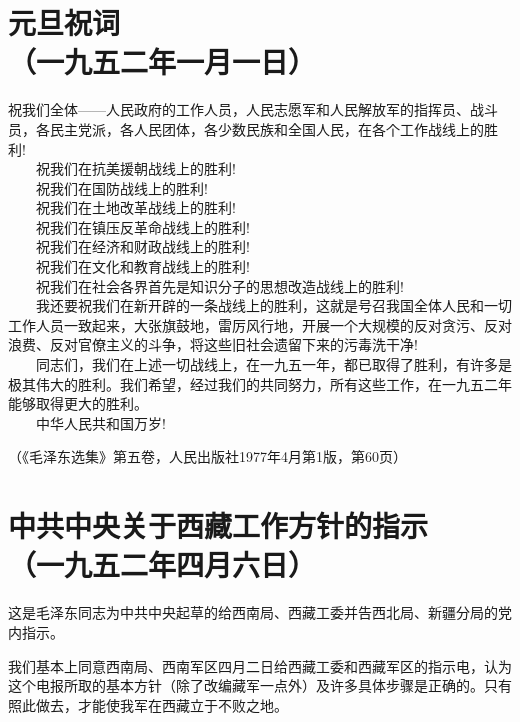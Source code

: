 \documentclass[cn,11pt,chinese]{elegantbook}
\def\myformat#1{\hfil\hfil #1}
\begin{document}
\newpage\section*{\myformat{元旦祝词}\\\myformat{（一九五二年一月一日）}}
祝我们全体——人民政府的工作人员，人民志愿军和人民解放军的指挥员、战斗员，各民主党派，各人民团体，各少数民族和全国人民，在各个工作战线上的胜利!\\
　　祝我们在抗美援朝战线上的胜利!\\
　　祝我们在国防战线上的胜利!\\
　　祝我们在土地改革战线上的胜利!\\
　　祝我们在镇压反革命战线上的胜利!\\
　　祝我们在经济和财政战线上的胜利!\\
　　祝我们在文化和教育战线上的胜利!\\
　　祝我们在社会各界首先是知识分子的思想改造战线上的胜利!\\
　　我还要祝我们在新开辟的一条战线上的胜利，这就是号召我国全体人民和一切工作人员一致起来，大张旗鼓地，雷厉风行地，开展一个大规模的反对贪污、反对浪费、反对官僚主义的斗争，将这些旧社会遗留下来的污毒洗干净!\\
　　同志们，我们在上述一切战线上，在一九五一年，都已取得了胜利，有许多是极其伟大的胜利。我们希望，经过我们的共同努力，所有这些工作，在一九五二年能够取得更大的胜利。\\
　　中华人民共和国万岁!\\
\begin{flushright}（《毛泽东选集》第五卷，人民出版社1977年4月第1版，第60页）\end{flushright}
\newpage\section*{\myformat{中共中央关于西藏工作方针的指示}\\\myformat{（一九五二年四月六日）}}
\begin{introduction}\item  这是毛泽东同志为中共中央起草的给西南局、西藏工委并告西北局、新疆分局的党内指示。\end{introduction}
我们基本上同意西南局、西南军区四月二日给西藏工委和西藏军区的指示电，认为这个电报所取的基本方针（除了改编藏军一点外）及许多具体步骤是正确的。只有照此做去，才能使我军在西藏立于不败之地。\\
\end{document}
